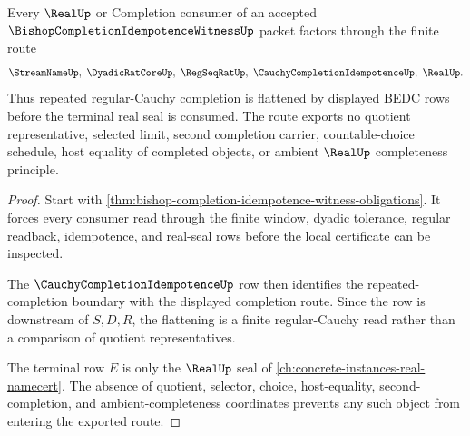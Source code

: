 \begin{theorem}
\label{thm:bishop-completion-idempotence-witness-route}
Every $\RealUp$ or Completion consumer of an accepted $\BishopCompletionIdempotenceWitnessUp$ packet factors through the finite route
$$
\StreamNameUp,\ \DyadicRatCoreUp,\ \RegSeqRatUp,\ \CauchyCompletionIdempotenceUp,\ \RealUp .
$$
Thus repeated regular-Cauchy completion is flattened by displayed BEDC rows before the terminal real seal is consumed. The route exports no quotient representative, selected limit, second completion carrier, countable-choice schedule, host equality of completed objects, or ambient $\RealUp$ completeness principle.
\end{theorem}
\begin{proof}
Start with \autoref{thm:bishop-completion-idempotence-witness-obligations}. It forces every consumer read through the finite window, dyadic tolerance, regular readback, idempotence, and real-seal rows before the local certificate can be inspected.

The $\CauchyCompletionIdempotenceUp$ row then identifies the repeated-completion boundary with the displayed completion route. Since the row is downstream of $S,D,R$, the flattening is a finite regular-Cauchy read rather than a comparison of quotient representatives.

The terminal row $E$ is only the $\RealUp$ seal of \autoref{ch:concrete-instances-real-namecert}. The absence of quotient, selector, choice, host-equality, second-completion, and ambient-completeness coordinates prevents any such object from entering the exported route.
\end{proof}




